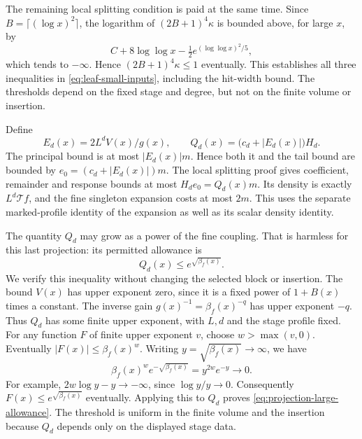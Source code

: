 The remaining local splitting condition is paid at the same time.
Since $B=\lceil(\log x)^2\rceil$, the logarithm of
$(2B+1)^4\kappa$ is bounded above, for large $x$, by
\[
 C+8\log\log x-\tfrac12 e^{(\log\log x)^2/5},
\]
which tends to $-\infty$. Hence $(2B+1)^4\kappa\le1$
eventually. This establishes all three inequalities in
\eqref{eq:leaf-small-inputs}, including the hit-width bound.
The thresholds depend on the fixed stage and degree, but not on
the finite volume or insertion.

Define
\[
     E_d(x)=2L^d V(x)/g(x),\qquad
     Q_d(x)=\bigl(c_d+|E_d(x)|\bigr)H_d.
\]
The principal bound is at most $|E_d(x)|m$. Hence both it and the
tail bound are bounded by $e_0=(c_d+|E_d(x)|)m$.
The local splitting proof gives coefficient, remainder and
response bounds at most $H_de_0=Q_d(x)m$. Its density is exactly
$L^d\mathcal T f$, and the fine singleton expansion costs at most
$2m$. This uses the separate marked-profile identity of the
expansion as well as its scalar density identity.

The quantity $Q_d$ may grow as a power of the fine coupling. That
is harmless for this last projection: its permitted allowance is
\begin{equation}\label{eq:projection-large-allowance}
                      Q_d(x)\le e^{\sqrt{\beta_f(x)}}.
\end{equation}
We verify this inequality without changing the selected block or
insertion. The bound $V(x)$ has upper exponent zero, since it is
a fixed power of $1+B(x)$ times a constant. The inverse gain
$g(x)^{-1}=\beta_f(x)^{-q}$ has upper exponent $-q$. Thus $Q_d$
has some finite upper exponent, with $L,d$ and the stage profile
fixed. For any function $F$ of finite upper exponent $v$, choose
$w>\max(v,0)$. Eventually $|F(x)|\le\beta_f(x)^w$.
Writing $y=\sqrt{\beta_f(x)}\to\infty$, we have
\[
 \beta_f(x)^w e^{-\sqrt{\beta_f(x)}}
                     =y^{2w}e^{-y}\longrightarrow0.
\]
For example, $2w\log y-y\to-\infty$, since $\log y/y\to0$.
Consequently $F(x)\le e^{\sqrt{\beta_f(x)}}$ eventually.
Applying this to $Q_d$ proves
\eqref{eq:projection-large-allowance}. The threshold is uniform
in the finite volume and the insertion because $Q_d$ depends
only on the displayed stage data.

